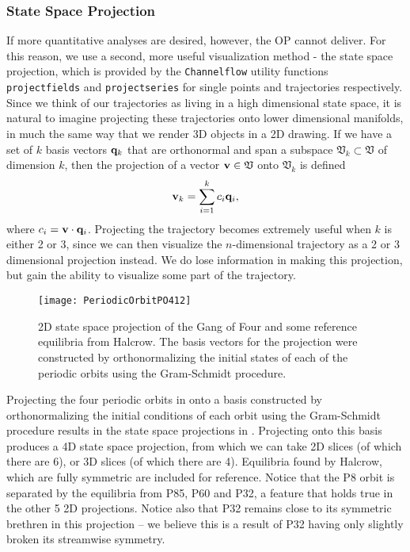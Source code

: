 \subsubsection{State Space Projection}
If more quantitative analyses are desired, however, the OP cannot deliver. For this reason, we use a second, more useful visualization method - the state space projection, which is provided by the {\tt Channelflow} utility functions {\tt projectfields} and {\tt projectseries} for single points and trajectories respectively. Since we think of our trajectories as living in a high dimensional state space, it is natural to imagine projecting these trajectories onto lower dimensional manifolds, in much the same way that we render 3D objects in a 2D drawing. If we have a set of $k$ basis vectors $\mathbf{q}_k$ that are orthonormal and span a subspace $\mathfrak{V}_k \subset \mathfrak{V}$ of dimension $k$, then the projection of a vector $\mathbf{v} \in \mathfrak{V}$ onto $\mathfrak{V}_k$ is defined 
\begin{equation}
\Vector{v}_k = \sum{i = 1}{k}{c_i \Vector{q}_i},
\end{equation}
where $c_i = \mathbf{v} \cdot \mathbf{q}_i$. Projecting the trajectory becomes extremely useful when $k$ is either 2 or 3, since we can then visualize the $n$-dimensional trajectory as a 2 or 3 dimensional projection instead. We do lose information in making this projection, but gain the ability to visualize some part of the trajectory. \\
\begin{figure}[h]
\texttt{[image: PeriodicOrbitPO412]}
\caption[2D state space projection of the Gang of Four and some reference equilibria from Halcrow.]{2D state space projection of the Gang of Four and some reference equilibria from Halcrow. The basis vectors for the projection were constructed by orthonormalizing the initial states of each of the periodic orbits using the Gram-Schmidt procedure.}\label{fig:POStateSpace}
\end{figure}
\clearpage Projecting the four periodic orbits in  onto a basis constructed by orthonormalizing the initial conditions of each orbit using the Gram-Schmidt procedure results in the state space projections in . Projecting onto this basis produces a 4D state space projection, from which we can take 2D slices (of which there are 6), or 3D slices (of which there are 4). Equilibria found by Halcrow, which are fully symmetric are included for reference.  Notice that the P8 orbit is separated by the equilibria from P85, P60 and P32, a feature that holds true in the other 5 2D projections. Notice also that P32 remains close to its symmetric brethren in this projection -- we believe this is a result of P32 having only slightly broken its streamwise symmetry. \\

